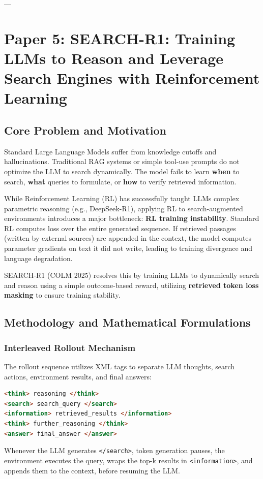 \documentclass[11pt,a4paper]{article}
\begin{document}
---

\section{Paper 5: SEARCH-R1: Training LLMs to Reason and Leverage Search Engines with Reinforcement Learning}
\label{sec:paper5}

\subsection{Core Problem and Motivation}
Standard Large Language Models suffer from knowledge cutoffs and hallucinations. Traditional RAG systems or simple tool-use prompts do not optimize the LLM to search dynamically. The model fails to learn \textbf{when} to search, \textbf{what} queries to formulate, or \textbf{how} to verify retrieved information. 

While Reinforcement Learning (RL) has successfully taught LLMs complex parametric reasoning (e.g., DeepSeek-R1), applying RL to search-augmented environments introduces a major bottleneck: \textbf{RL training instability}. Standard RL computes loss over the entire generated sequence. If retrieved passages (written by external sources) are appended in the context, the model computes parameter gradients on text it did not write, leading to training divergence and language degradation.

SEARCH-R1 (COLM 2025) resolves this by training LLMs to dynamically search and reason using a simple outcome-based reward, utilizing \textbf{retrieved token loss masking} to ensure training stability.

\subsection{Methodology and Mathematical Formulations}
\subsubsection{Interleaved Rollout Mechanism}
The rollout sequence utilizes XML tags to separate LLM thoughts, search actions, environment results, and final answers:
\begin{lstlisting}[language=html]
<think> reasoning </think>
<search> search_query </search>
<information> retrieved_results </information>
<think> further_reasoning </think>
<answer> final_answer </answer>
\end{lstlisting}
Whenever the LLM generates \texttt{</search>}, token generation pauses, the environment executes the query, wraps the top-k results in \texttt{<information>}, and appends them to the context, before resuming the LLM.
\end{document}
